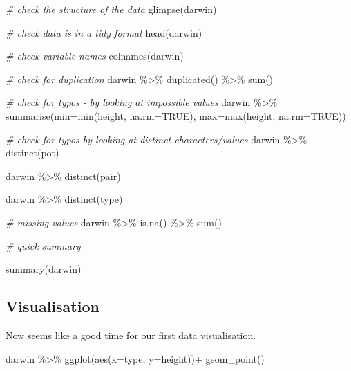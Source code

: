 \documentclass[
]{book}
\newenvironment{Shaded}{\begin{snugshade}}{\end{snugshade}}
\newcommand{\AttributeTok}[1]{\textcolor[rgb]{0.77,0.63,0.00}{#1}}
\newcommand{\CommentTok}[1]{\textcolor[rgb]{0.56,0.35,0.01}{\textit{#1}}}
\newcommand{\ConstantTok}[1]{\textcolor[rgb]{0.00,0.00,0.00}{#1}}
\newcommand{\FunctionTok}[1]{\textcolor[rgb]{0.00,0.00,0.00}{#1}}
\newcommand{\NormalTok}[1]{#1}
\newcommand{\SpecialCharTok}[1]{\textcolor[rgb]{0.00,0.00,0.00}{#1}}
\begin{document}
\begin{Shaded}
\begin{Highlighting}[]
\CommentTok{\# check the structure of the data}
\FunctionTok{glimpse}\NormalTok{(darwin)}

\CommentTok{\# check data is in a tidy format}
\FunctionTok{head}\NormalTok{(darwin)}

\CommentTok{\# check variable names}
\FunctionTok{colnames}\NormalTok{(darwin)}

\CommentTok{\# check for duplication}
\NormalTok{darwin }\SpecialCharTok{\%\textgreater{}\%} 
  \FunctionTok{duplicated}\NormalTok{() }\SpecialCharTok{\%\textgreater{}\%} 
  \FunctionTok{sum}\NormalTok{()}

\CommentTok{\# check for typos {-} by looking at impossible values}
\NormalTok{darwin }\SpecialCharTok{\%\textgreater{}\%} 
  \FunctionTok{summarise}\NormalTok{(}\AttributeTok{min=}\FunctionTok{min}\NormalTok{(height, }\AttributeTok{na.rm=}\ConstantTok{TRUE}\NormalTok{), }
            \AttributeTok{max=}\FunctionTok{max}\NormalTok{(height, }\AttributeTok{na.rm=}\ConstantTok{TRUE}\NormalTok{))}

\CommentTok{\# check for typos by looking at distinct characters/values}
\NormalTok{darwin }\SpecialCharTok{\%\textgreater{}\%} 
  \FunctionTok{distinct}\NormalTok{(pot)}

\NormalTok{darwin }\SpecialCharTok{\%\textgreater{}\%} 
  \FunctionTok{distinct}\NormalTok{(pair)}

\NormalTok{darwin }\SpecialCharTok{\%\textgreater{}\%} 
  \FunctionTok{distinct}\NormalTok{(type)}

\CommentTok{\# missing values}
\NormalTok{darwin }\SpecialCharTok{\%\textgreater{}\%} 
  \FunctionTok{is.na}\NormalTok{() }\SpecialCharTok{\%\textgreater{}\%} 
  \FunctionTok{sum}\NormalTok{()}

\CommentTok{\# quick summary}

\FunctionTok{summary}\NormalTok{(darwin)}
\end{Highlighting}
\end{Shaded}

\hypertarget{visualisation}{%
\subsection{Visualisation}\label{visualisation}}

Now seems like a good time for our first data visualisation.

\begin{Shaded}
\begin{Highlighting}[]
\NormalTok{darwin }\SpecialCharTok{\%\textgreater{}\%} 
  \FunctionTok{ggplot}\NormalTok{(}\FunctionTok{aes}\NormalTok{(}\AttributeTok{x=}\NormalTok{type,}
         \AttributeTok{y=}\NormalTok{height))}\SpecialCharTok{+}
  \FunctionTok{geom\_point}\NormalTok{()}
\end{Highlighting}
\end{Shaded}
\end{document}
